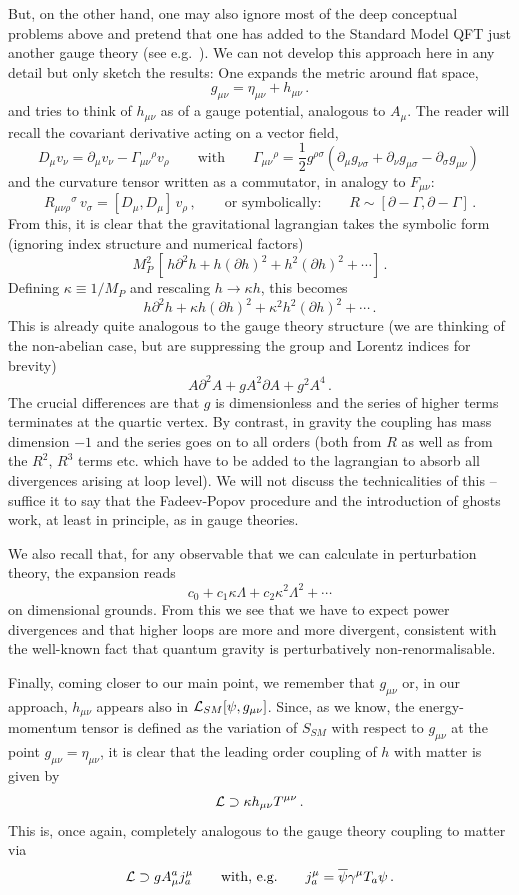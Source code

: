 \documentclass[12pt]{article}
\newcommand{\be}{\begin{equation}}
\newcommand{\ee}{\end{equation}}
\newcommand{\ol}{\overline}
\numberwithin{equation}{section}
\begin{document}
But, on the other hand, one may also ignore most of the deep conceptual problems above and pretend that one has added to the Standard Model QFT just another gauge theory (see e.g.~\cite{vel}). We can not develop this approach here in any detail but only sketch the results: One expands the metric around flat space,
\be
g_{\mu\nu}=\eta_{\mu\nu}+h_{\mu\nu}\,.
\ee
and tries to think of $h_{\mu\nu}$ as of a gauge potential, analogous to $A_\mu$. The reader will recall the covariant derivative acting on a vector field,
\be
D_\mu v_\nu=\partial_\mu v_\nu-\Gamma_{\mu\nu}{}^\rho v_\rho\qquad \mbox{with}\qquad \Gamma_{\mu\nu}{}^\rho=\frac{1}{2}g^{\rho\sigma}(\partial_\mu
g_{\nu\sigma}+  \partial_\nu
g_{\mu\sigma} -  \partial_\sigma
g_{\mu\nu} )\,
\ee
and the curvature tensor written as a commutator, in analogy to $F_{\mu\nu}$:
\be
R_{\mu\nu\rho}{}^\sigma\,v_\sigma = [D_\mu,D_\mu]\,v_\rho\,,\qquad \mbox{or symbolically:}\qquad R \sim [\partial-\Gamma,\partial-\Gamma]\,.
\ee
From this, it is clear that the gravitational lagrangian takes the symbolic form (ignoring index structure and numerical factors)
\be
M_P^2\,[\,h\partial^2 h+h(\partial h)^2+h^2(\partial h)^2+\cdots]\,.
\ee
Defining $\kappa\equiv 1/M_P$ and rescaling $h\to \kappa h$, this becomes
\be
h\partial^2h+\kappa h(\partial h)^2+\kappa^2h^2(\partial h)^2+\cdots\,.
\ee
This is already quite analogous to the gauge theory structure (we are thinking of the non-abelian case, but are suppressing the group and Lorentz indices for brevity)
\be
A \partial^2 A+ gA^2\partial A+ g^2 A^4\,.
\ee
The crucial differences are that $g$ is dimensionless and the series of higher terms terminates at the quartic vertex. By contrast, in gravity the coupling has mass dimension $-1$ and the series goes on to all orders (both from $R$ as well as from the $R^2$, $R^3$ terms etc. which have to be added to the lagrangian to absorb all divergences arising at loop level). We will not discuss the technicalities of this -- suffice it to say that the Fadeev-Popov procedure and the introduction of ghosts work, at least in principle, as in gauge theories. 

We also recall that, for any observable that we can calculate in perturbation theory, the expansion reads
\be
c_0+c_1\kappa\Lambda+c_2\kappa^2\Lambda^2+\cdots
\ee
on dimensional grounds. From this we see that we have to expect power divergences and that higher loops are more and more divergent, consistent with the well-known fact that quantum gravity is perturbatively non-renormalisable. 

Finally, coming closer to our main point, we remember that $g_{\mu\nu}$ or, in our approach, $h_{\mu\nu}$ appears also in ${\cal L}_{SM}[\psi,g_{\mu\nu}]$. Since, as we know, the energy-momentum tensor is defined as the variation of $S_{SM}$ with respect to $g_{\mu\nu}$ at the point $g_{\mu\nu}=\eta_{\mu\nu}$, it is clear that the leading order coupling of $h$ with matter is given by
\be
{\cal L}\supset \kappa h_{\mu\nu}T^{\mu\nu}\,.
\ee
This is, once again, completely analogous to the gauge theory coupling to matter via
\be
{\cal L}\supset g A_\mu^a j^\mu_a \qquad\mbox{with, e.g.}\qquad j_a^\mu=\ol{\psi}\gamma^\mu T_a\psi\,.
\ee
\end{document}
